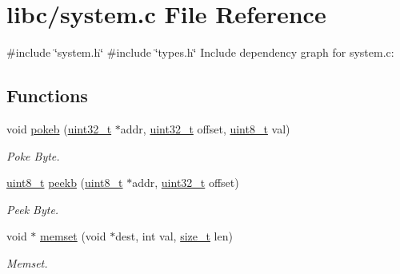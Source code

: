 \hypertarget{a00086}{}\section{libc/system.c File Reference}
\label{a00086}
{\ttfamily \#include \char`\"{}system.\+h\char`\"{}}\newline
{\ttfamily \#include \char`\"{}types.\+h\char`\"{}}\newline
Include dependency graph for system.\+c\+:
\subsection*{Functions}
\begin{DoxyCompactItemize}
\item 
void \hyperlink{a00086_aa291c9926b84df379482632e80ec7c47_aa291c9926b84df379482632e80ec7c47}{pokeb} (\hyperlink{a00092_a435d1572bf3f880d55459d9805097f62_a435d1572bf3f880d55459d9805097f62}{uint32\+\_\+t} $\ast$addr, \hyperlink{a00092_a435d1572bf3f880d55459d9805097f62_a435d1572bf3f880d55459d9805097f62}{uint32\+\_\+t} offset, \hyperlink{a00092_aba7bc1797add20fe3efdf37ced1182c5_aba7bc1797add20fe3efdf37ced1182c5}{uint8\+\_\+t} val)
\begin{DoxyCompactList}\small\item\em Poke Byte. \end{DoxyCompactList}\item 
\hyperlink{a00092_aba7bc1797add20fe3efdf37ced1182c5_aba7bc1797add20fe3efdf37ced1182c5}{uint8\+\_\+t} \hyperlink{a00086_a353956c1fd65c7ed787836534fc9354e_a353956c1fd65c7ed787836534fc9354e}{peekb} (\hyperlink{a00092_aba7bc1797add20fe3efdf37ced1182c5_aba7bc1797add20fe3efdf37ced1182c5}{uint8\+\_\+t} $\ast$addr, \hyperlink{a00092_a435d1572bf3f880d55459d9805097f62_a435d1572bf3f880d55459d9805097f62}{uint32\+\_\+t} offset)
\begin{DoxyCompactList}\small\item\em Peek Byte. \end{DoxyCompactList}\item 
void $\ast$ \hyperlink{a00086_a9e432f267691eceb2e2e0efcc37efbc9_a9e432f267691eceb2e2e0efcc37efbc9}{memset} (void $\ast$dest, int val, \hyperlink{a00038_a7c94ea6f8948649f8d181ae55911eeaf_a7c94ea6f8948649f8d181ae55911eeaf}{size\+\_\+t} len)
\begin{DoxyCompactList}\small\item\em Memset. \end{DoxyCompactList}\end{DoxyCompactItemize}


